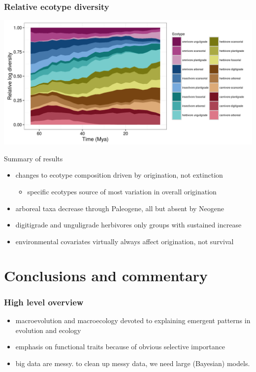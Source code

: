 \documentclass{beamer}
\begin{document}
\begin{frame}
  \frametitle{Relative ecotype diversity}
  \begin{center}
    \includegraphics[height=0.8\textheight,width=\textwidth,keepaspectratio=true]{figure/relative_diversity}
  \end{center}
\end{frame}

\begin{frame}
  \begin{block}{Summary of results}
    \begin{itemize}
      \item changes to ecotype composition driven by origination, not extinction
        \begin{itemize}
          \item specific ecotypes source of most variation in overall origination
        \end{itemize}
      \item arboreal taxa decrease through Paleogene, all but absent by Neogene
      \item digitigrade and unguligrade herbivores only groups with sustained increase
      \item environmental covariates virtually always affect origination, not survival
    \end{itemize}
  \end{block}
\end{frame}


\endgroup


\section{Conclusions and commentary}
\begin{frame}
  \frametitle{High level overview}
  \begin{itemize}
    \item macroevolution and macroecology devoted to explaining emergent patterns in evolution and ecology
    \item emphasis on functional traits because of obvious selective importance
    \item big data are messy. to clean up messy data, we need large (Bayesian) models.
  \end{itemize}
\end{frame}
\end{document}
